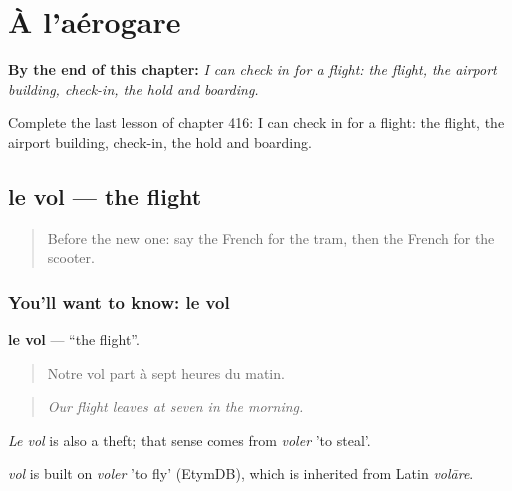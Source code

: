 
\chapter{À l'aérogare}
\label{ch:fr-a-l-aerogare}

\begin{chapteropening}
\textbf{By the end of this chapter:} \emph{I can check in for a flight: the flight, the airport building, check-in, the hold and boarding.}

Complete the last lesson of chapter 416: I can check in for a flight: the flight, the airport building, check-in, the hold and boarding.
\end{chapteropening}

\section[le vol]{le vol — the flight}

\label{lesson:FR-C416-vol}



\begin{quote}
Before the new one: say the French for the tram, then the French for the scooter.
\end{quote}

\subsection*{You'll want to know: le vol}
\textbf{le vol} — \textquotedblleft{}the flight\textquotedblright{}.

\begin{quote}
Notre vol part à sept heures du matin.
\end{quote}

\begin{quote}
\emph{Our flight leaves at seven in the morning.}
\end{quote}

\emph{Le vol} is also a theft; that sense comes from \emph{voler} 'to steal'.

\begin{cousinweb}
\emph{vol} is built on \emph{voler} 'to fly' (EtymDB), which is inherited from Latin \emph{volāre}.
\end{cousinweb}

